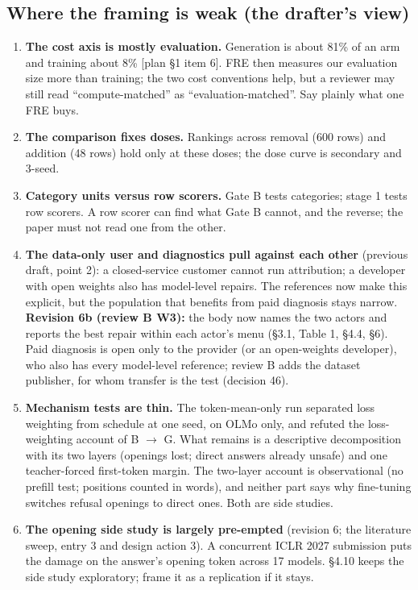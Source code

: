 \documentclass{article}
\theoremstyle{plain}
\theoremstyle{definition}
\theoremstyle{remark}
\begin{document}
\subsection{Where the framing is weak (the drafter's view)}

\begin{enumerate}
  \item \textbf{The cost axis is mostly evaluation.} Generation is about 81\% of
        an arm and training about 8\% [plan \S{}1 item 6]. FRE then measures our
        evaluation size more than training; the two cost conventions help, but a
        reviewer may still read ``compute-matched'' as ``evaluation-matched''.
        Say plainly what one FRE buys.
  \item \textbf{The comparison fixes doses.} Rankings across removal (600 rows)
        and addition (48 rows) hold only at these doses; the dose curve is
        secondary and 3-seed.
  \item \textbf{Category units versus row scorers.} Gate B tests categories;
        stage 1 tests row scorers. A row scorer can find what Gate B cannot, and
        the reverse; the paper must not read one from the other.
  \item \textbf{The data-only user and diagnostics pull against each other}
        (previous draft, point 2): a closed-service customer cannot run
        attribution; a developer with open weights also has model-level repairs.
        The references now make this explicit, but the population that benefits
        from paid diagnosis stays narrow. \textbf{Revision 6b (review B W3):}
        the body now names the two actors and reports the best repair within
        each actor's menu (\S{}3.1, Table 1, \S{}4.4, \S{}6). Paid diagnosis is
        open only to the provider (or an open-weights developer), who also has
        every model-level reference; review B adds the dataset publisher, for
        whom transfer is the test (decision 46).
  \item \textbf{Mechanism tests are thin.} The token-mean-only run separated
        loss weighting from schedule at one seed, on OLMo only, and refuted the
        loss-weighting account of B $\to$ G. What remains is a descriptive
        decomposition with its two layers (openings lost; direct answers already
        unsafe) and one teacher-forced first-token margin. The two-layer account
        is observational (no prefill test; positions counted in words), and
        neither part says why fine-tuning switches refusal openings to direct
        ones. Both are side studies.
  \item \textbf{The opening side study is largely pre-empted} (revision 6; the
        literature sweep, entry 3 and design action 3). A concurrent ICLR 2027
        submission puts the damage on the answer's opening token across 17
        models. \S{}4.10 keeps the side study exploratory; frame it as a
        replication if it stays.
\end{enumerate}
\end{document}
